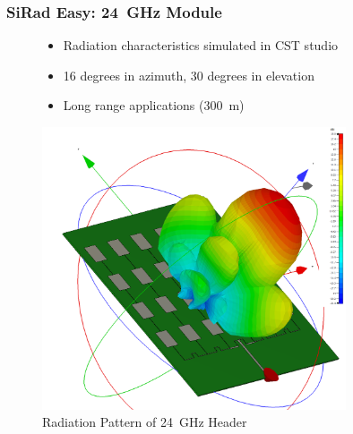 \documentclass[aspectratio=169]{beamer}
\begin{document}
\begin{frame}[fragile]
  \frametitle{SiRad Easy: 24~GHz Module}
  \begin{figure}[!htb]
    \begin{minipage}{0.48\textwidth}
      \begin{itemize}
        \item Radiation characteristics simulated in CST studio
        \item 16 degrees in azimuth, 30 degrees in elevation
        \item Long range applications (300~m)
      \end{itemize}
    \end{minipage}\hfill
    \begin{minipage}{0.48\textwidth}
      \centering
    \includegraphics[width=0.8\textwidth]{../img/farfield3d.png}
    \caption{Radiation Pattern of 24~GHz Header}
    \end{minipage}
  \end{figure}
\end{frame}
\end{document}
